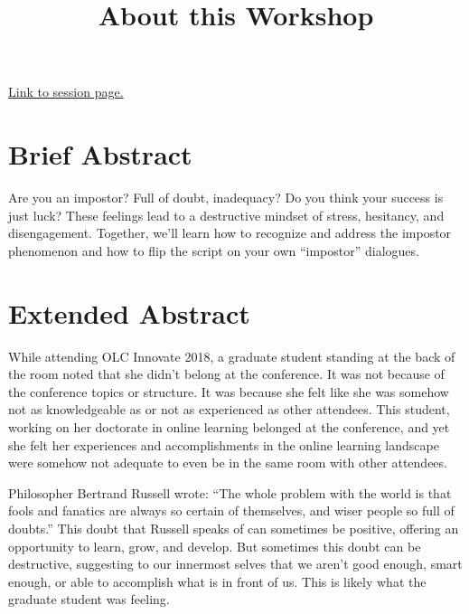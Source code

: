 \documentclass[]{article}
\title{About this Workshop}
\author{}
\date{}
\begin{document}
\maketitle

\href{https://onlinelearningconsortium.org/olc-accelerate-2019-session-page/?session=7732}{Link
to session page.}

\hypertarget{brief-abstract}{%
\section{Brief Abstract}\label{brief-abstract}}

Are you an impostor? Full of doubt, inadequacy? Do you think your
success is just luck? These feelings lead to a destructive mindset of
stress, hesitancy, and disengagement. Together, we'll learn how to
recognize and address the impostor phenomenon and how to flip the script
on your own ``impostor'' dialogues.

\hypertarget{extended-abstract}{%
\section{Extended Abstract}\label{extended-abstract}}

While attending OLC Innovate 2018, a graduate student standing at the
back of the room noted that she didn't belong at the conference. It was
not because of the conference topics or structure. It was because she
felt like she was somehow not as knowledgeable as or not as experienced
as other attendees. This student, working on her doctorate in online
learning belonged at the conference, and yet she felt her experiences
and accomplishments in the online learning landscape were somehow not
adequate to even be in the same room with other attendees.

Philosopher Bertrand Russell wrote: ``The whole problem with the world
is that fools and fanatics are always so certain of themselves, and
wiser people so full of doubts.'' This doubt that Russell speaks of can
sometimes be positive, offering an opportunity to learn, grow, and
develop. But sometimes this doubt can be destructive, suggesting to our
innermost selves that we aren't good enough, smart enough, or able to
accomplish what is in front of us. This is likely what the graduate
student was feeling.
\end{document}
